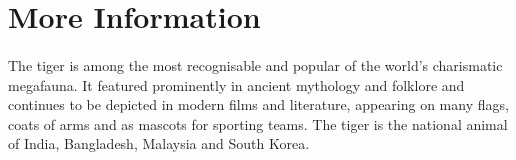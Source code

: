 \documentclass[12pt]{article}
\begin{document}
    \pagebreak
    \section{More Information}
    \paragraph{}
    The tiger is among the most recognisable and popular of the world's charismatic megafauna. It featured prominently in ancient mythology and folklore and continues to be depicted in modern films and literature, appearing on many flags, coats of arms and as mascots for sporting teams. The tiger is the national animal of India, Bangladesh, Malaysia and South Korea.
    
    \printindex
\end{document}
